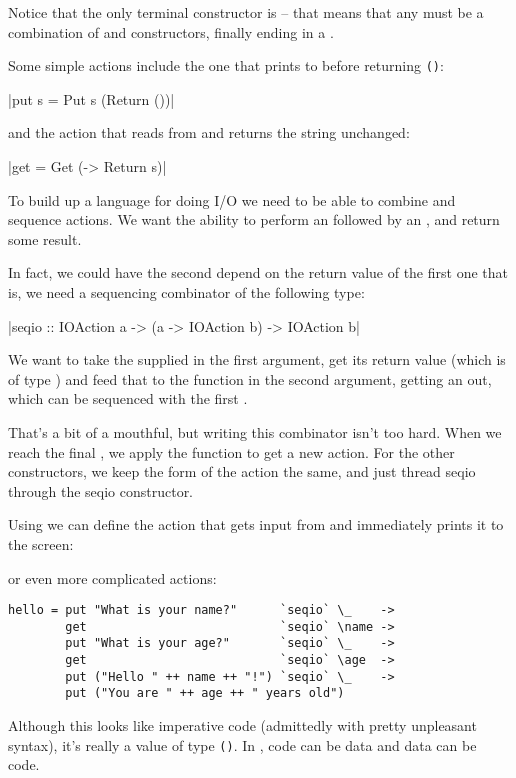 \documentclass[thesis-solanki.tex]{subfiles}
\begin{document}
Notice that the only terminal constructor is  --
that means that any  must be a combination of  and  constructors, 
finally ending in a .

Some simple actions include the one that prints to  before returning \Verb!()!:

|put s = Put s (Return ())|

and the action that reads from  and returns the string unchanged:

|get = Get (\s -> Return s)|

To build up a language for doing I/O we need to be able to combine and sequence actions. We want the ability to perform an   
followed by an  , and return some result.

In fact, we could have the second  depend on the return value of the first one 
that is, we need a sequencing combinator of the 
following type:

|seqio :: IOAction a -> (a -> IOAction b) -> IOAction b|

We want to take the   supplied in the first argument, get its return value (which is of type ) and feed that to the function in 
the second argument, getting an   out, which can be sequenced with the first  .

That's a bit of a mouthful, but writing this combinator isn't too hard. When we reach the final , we apply the function  to get a 
new action. For the other constructors, we keep the form of the action the same, and just thread seqio through the seqio constructor.

Using  we can define the action that gets input from  and immediately prints it to
the screen: 


or even more complicated actions:
\begin{verbatim}
hello = put "What is your name?"      `seqio` \_    ->
        get                           `seqio` \name ->
        put "What is your age?"       `seqio` \_    ->
        get                           `seqio` \age  ->
        put ("Hello " ++ name ++ "!") `seqio` \_    ->
        put ("You are " ++ age ++ " years old")
\end{verbatim}
Although this looks like imperative code (admittedly with pretty unpleasant syntax), it's really a value of type  \Verb!()!. In ,
code can be data and data can be code.
\end{document}
